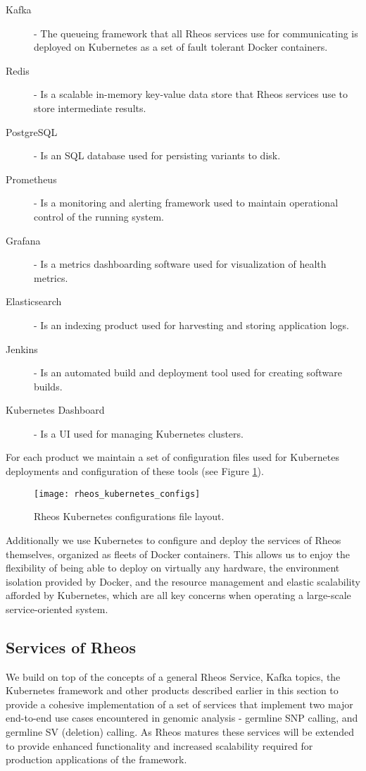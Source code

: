 \begin{description}
    \item [Kafka] - The queueing framework that all Rheos services use for communicating is deployed on Kubernetes as a set of fault tolerant Docker containers.
    \item [Redis] - Is a scalable in-memory key-value data store that Rheos services use to store intermediate results.
    \item [PostgreSQL] - Is an SQL database used for persisting variants to disk.
    \item [Prometheus] - Is a monitoring and alerting framework used to maintain operational control of the running system.
    \item [Grafana] - Is a metrics dashboarding software used for visualization of health metrics.
    \item [Elasticsearch] - Is an indexing product used for harvesting and storing application logs. 
    \item [Jenkins] - Is an automated build and deployment tool used for creating software builds.
    \item [Kubernetes Dashboard] - Is a UI used for managing Kubernetes clusters.
\end{description}

For each product we maintain a set of configuration files used for Kubernetes deployments and configuration of these tools (see Figure \ref{fig:rheos_kubernetes_configs}).

\begin{figure}[h!]
    \texttt{[image: rheos\_kubernetes\_configs]}
    \centering
    \caption {Rheos Kubernetes configurations file layout.}
    \label{fig:rheos_kubernetes_configs}
\end{figure}

Additionally we use Kubernetes to configure and deploy the services of Rheos themselves, organized as fleets of Docker containers. This allows us to enjoy the flexibility of being able to deploy on virtually any hardware, the environment isolation provided by Docker, and the resource management and elastic scalability afforded by Kubernetes, which are all key concerns when operating a large-scale service-oriented system.

\subsection{Services of Rheos}

We build on top of the concepts of a general Rheos Service, Kafka topics, the Kubernetes framework and other products described earlier in this section to provide a cohesive implementation of a set of services that implement two major end-to-end use cases encountered in genomic analysis - germline SNP calling, and germline SV (deletion) calling. As Rheos matures these services will be extended to provide enhanced functionality and increased scalability required for production applications of the framework. 

